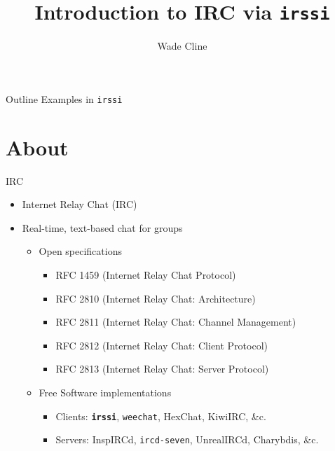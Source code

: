 \documentclass{beamer}
\title[IRC Intro]{Introduction to IRC via \texttt{irssi}}
\author{Wade Cline}
\begin{document}
\begin{frame}
  \titlepage
\end{frame}

\begin{frame}{Outline}
	\tableofcontents
	Examples in \texttt{irssi}
\end{frame}

\section{About}

\begin{frame}{IRC}
\begin{itemize}
	\item Internet Relay Chat (IRC)
	\item Real-time, text-based chat for groups
	\begin{itemize}
		\item Open specifications
		\begin{itemize}
			\item RFC 1459 (Internet Relay Chat Protocol)
			\item RFC 2810 (Internet Relay Chat: Architecture)
			\item RFC 2811 (Internet Relay Chat: Channel Management)
			\item RFC 2812 (Internet Relay Chat: Client Protocol)
			\item RFC 2813 (Internet Relay Chat: Server Protocol)
		\end{itemize}
		\item Free Software implementations
		\begin{itemize}
			\item Clients: \textbf{\texttt{irssi}}, \texttt{weechat}, HexChat, KiwiIRC, \&c.
			\item Servers: InspIRCd, \texttt{ircd-seven}, UnrealIRCd, Charybdis, \&c.
		\end{itemize}

\end{itemize}
\end{itemize}
\end{frame}
\end{document}
